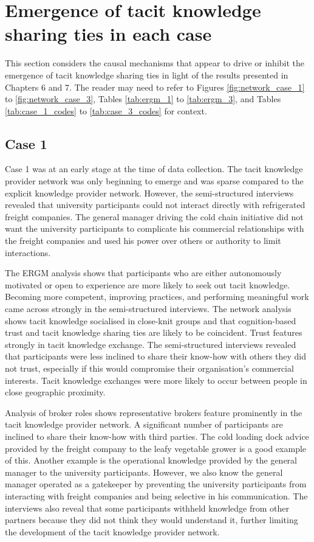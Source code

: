 \section{Emergence of tacit knowledge sharing ties in each case}

This section considers the causal mechanisms that appear to drive or inhibit the emergence of tacit knowledge sharing ties in light of the results presented in Chapters 6 and 7. The reader may need to refer to Figures \ref{fig:network_case_1} to \ref{fig:network_case_3}, Tables \ref{tab:ergm_1} to \ref{tab:ergm_3}, and Tables \ref{tab:case_1_codes} to \ref{tab:case_3_codes} for context.

\subsection{Case 1}

Case 1 was at an early stage at the time of data collection. The tacit knowledge provider network was only beginning to emerge and was sparse compared to the explicit knowledge provider network. However, the semi-structured interviews revealed that university participants could not interact directly with refrigerated freight companies. The general manager driving the cold chain initiative did not want the university participants to complicate his commercial relationships with the freight companies and used his power over others or authority to limit interactions. \medskip

The ERGM analysis shows that participants who are either autonomously motivated or open to experience are more likely to seek out tacit knowledge. Becoming more competent, improving practices, and performing meaningful work came across strongly in the semi-structured interviews. The network analysis shows tacit knowledge socialised in close-knit groups and that cognition-based trust and tacit knowledge sharing ties are likely to be coincident. Trust features strongly in tacit knowledge exchange. The semi-structured interviews revealed that participants were less inclined to share their know-how with others they did not trust, especially if this would compromise their organisation's commercial interests. Tacit knowledge exchanges were more likely to occur between people in close geographic proximity. \medskip

Analysis of broker roles shows representative brokers feature prominently in the tacit knowledge provider network. A significant number of participants are inclined to share their know-how with third parties. The cold loading dock advice provided by the freight company to the leafy vegetable grower is a good example of this. Another example is the operational knowledge provided by the general manager to the university participants. However, we also know the general manager operated as a gatekeeper by preventing the university participants from interacting with freight companies and being selective in his communication. The interviews also reveal that some participants withheld knowledge from other partners because they did not think they would understand it, further limiting the development of the tacit knowledge provider network. \medskip

